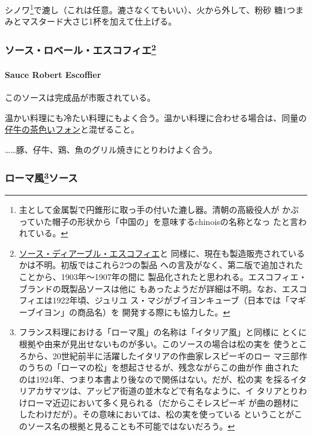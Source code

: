 シノワ\footnote{主として金属製で円錐形に取っ手の付いた漉し器。清朝の高級役人が
  かぶっていた帽子の形状から「中国の」を意味するchinoisの名称となっ
  たと言われている。}で漉し（これは任意。漉さなくてもいい）、火から外して、粉砂
糖1つまみとマスタード大さじ1杯を加えて仕上げる。

\maeaki

\hypertarget{ux30bdux30fcux30b9ux30edux30d9ux30fcux30ebux30a8ux30b9ux30b3ux30d5ux30a3ux30a879}{%
\subsubsection[ソース・ロベール・エスコフィエ]{\texorpdfstring{ソース・ロベール・エスコフィエ\footnote{\protect\hyperlink{sauce-diable-escoffier}{ソース・ディアーブル・エスコフィエ}と
  同様に、現在も製造販売されているかは不明。初版ではこれら2つの製品
  への言及がなく、第二版で追加されたことから、1903年〜1907年の間に
  製品化されたと思われる。エスコフィエ・ブランドの既製品ソースは他に
  もあったようだが詳細は不明。なお、エスコフィエは1922年頃、ジュリユ
  ス・マジがブイヨンキューブ（日本では「マギーブイヨン」の商品名）を
  開発する際にも協力した。}}{ソース・ロベール・エスコフィエ}}\label{ux30bdux30fcux30b9ux30edux30d9ux30fcux30ebux30a8ux30b9ux30b3ux30d5ux30a3ux30a879}}

\hypertarget{sauce-robert-escoffier}{%
\paragraph{Sauce Robert Escoffier}\label{sauce-robert-escoffier}}


このソースは完成品が市販されている。

温かい料理にも冷たい料理にもよく合う。温かい料理に合わせる場合は、同量の\protect\hyperlink{fonds-de-veau-brun}{仔牛の茶色いフォン}と混ぜること。

\ldots{}\ldots{}豚、仔牛、鶏、魚のグリル焼きにとりわけよく合う。

\maeaki

\hypertarget{ux30edux30fcux30deux98a880ux30bdux30fcux30b9}{%
\subsubsection[ローマ風ソース]{\texorpdfstring{ローマ風\footnote{フランス料理における「ローマ風」の名称は「イタリア風」と同様に
  とくに根拠や由来が見出せないものが多い。このソースの場合は松の実を
  使うところから、20世紀前半に活躍したイタリアの作曲家レスピーギのロー
  マ三部作のうちの「ローマの松」を想起させるが、残念ながらこの曲が作
  曲されたのは1924年、つまり本書より後なので関係はない。だが、松の実
  を採るイタリアカサマツは、アッピア街道の並木などで有名なように、イ
  タリアとりわけローマ近辺において多く見られる（だからこそレスピーギ
  が曲の題材にしたわけだが）。その意味においては、松の実を使っている
  ということがこのソース名の根拠と見ることも不可能ではないだろう。}ソース}{ローマ風ソース}}\label{ux30edux30fcux30deux98a880ux30bdux30fcux30b9}}

